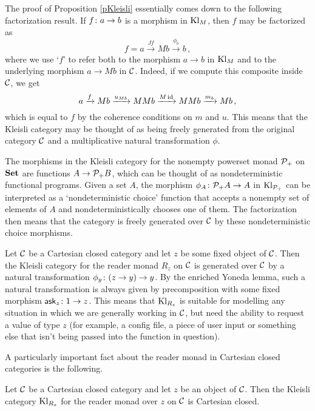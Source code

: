 \documentclass[11pt]{report}
\begin{document}
The proof of Proposition \ref{pKleisli} essentially comes down to the following factorization result.  
If $f\colon a \to b$ is a morphism in $\operatorname{Kl}_M$, then $f$ may be factorized as
\[
  f = a \xrightarrow{Jf}
  Mb \xrightarrow{\phi_b}
  b\,,
  \]
where we use `$f$' to refer both to the morphism $a\to b$ in $\operatorname{Kl}_M$ and to the underlying morphism $a \to Mb$ in ${\mathcal{C}}$.
Indeed, if we compute this composite inside ${\mathcal{C}}$, we get
\[
  a \xrightarrow{f}
  Mb \xrightarrow{u_{Mb}}
  MMb \xrightarrow{M\operatorname{id}}
  MMb \xrightarrow{m_b}
  Mb\,,
  \]
which is equal to $f$ by the coherence conditions on $m$ and $u$.
This means that the Kleisli category may be thought of as being freely generated from the original category ${\mathcal{C}}$ and a multiplicative natural transformation $\phi$.

\begin{example}
  The morphisms in the Kleisli category for the nonempty powerset monad $\mathcal P_+$ on ${\normalfont\textbf{Set}}$ are functions $A \to \mathcal P_+B$, which can be thought of as nondeterministic functional programs.  
  Given a set $A$, the morphism $\phi_A\colon \mathcal P_+A \to A$ in $\operatorname{Kl}_{\mathcal P_+}$ can be interpreted as a `nondeterministic choice' function that accepts a nonempty set of elements of $A$ and nondeterministically chooses one of them.
  The factorization then means that the category is freely generated over ${\mathcal{C}}$ by these nondeterministic choice morphisms.
\end{example}
\begin{example}
  Let ${\mathcal{C}}$ be a Cartesian closed category and let $z$ be some fixed object of ${\mathcal{C}}$.  
  Then the Kleisli category for the reader monad $R_z$ on ${\mathcal{C}}$ is generated over ${\mathcal{C}}$ by a natural transformation $\phi_y\colon (z \to y) \to y$.  
  By the enriched Yoneda lemma, such a natural transformation is always given by precomposition with some fixed morphism $\operatorname{{\mathsf{ask}}}_z\colon 1 \to z$.  
  This means that $\operatorname{Kl}_{R_z}$ is suitable for modelling any situation in which we are generally working in ${\mathcal{C}}$, but need the ability to request a value of type $z$ (for example, a config file, a piece of user input or something else that isn't being passed into the function in question).
  \label{ExReaderMonadKleisli}
\end{example}

A particularly important fact about the reader monad in Cartesian closed categories is the following.

\begin{theorem}
  Let ${\mathcal{C}}$ be a Cartesian closed category and let $z$ be an object of ${\mathcal{C}}$.  
  Then the Kleisli category $\operatorname{Kl}_{R_z}$ for the reader monad over $z$ on ${\mathcal{C}}$ is Cartesian closed.
  \label{FunctionalCompletenessCcc}
\end{theorem}
\end{document}
